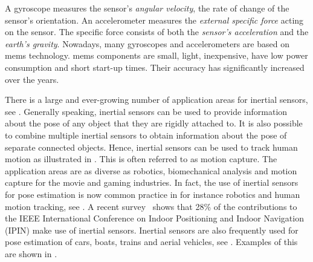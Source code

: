 \setcounter{footnote}{2}

A gyroscope measures the sensor's \emph{angular velocity}, \ie the rate of change of the sensor's orientation. An accelerometer measures the \emph{external specific force} acting on the sensor. The specific force consists of both the \emph{sensor's acceleration} and the \emph{earth's gravity}. Nowadays, many gyroscopes and accelerometers are based on \gls{mems} technology. \Gls{mems} components are small, light, inexpensive, have low power consumption and short start-up times. Their accuracy has significantly increased over the years. 

There is a large and ever-growing number of application areas for inertial sensors, see \eg \cite{barbourS:2001,hol:2011,perlmutterR:2012,xsens-tutorial}. Generally speaking, inertial sensors can be used to provide information about the pose of any object that they are rigidly attached to. It is also possible to combine multiple inertial sensors to obtain information about the pose of separate connected objects. Hence, inertial sensors can be used to track human motion as illustrated in . This is often referred to as motion capture. The application areas are as diverse as robotics, biomechanical analysis and motion capture for the movie and gaming industries. In fact, the use of inertial sensors for pose estimation is now common practice in for instance robotics and human motion tracking, see \eg \cite{luingeV2005,harle:2013,raibertBNPT:2008}. A recent survey~\citep{adlerSWK:2015} shows that 28\% of the contributions to the IEEE International Conference on Indoor Positioning and Indoor Navigation (IPIN) make use of inertial sensors. Inertial sensors are also frequently used for pose estimation of cars, boats, trains and aerial vehicles, see \eg \cite{skogH:2009,chaoCC:2010}. Examples of this are shown in . 

